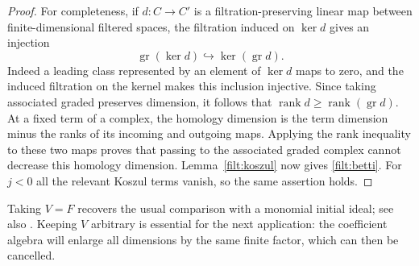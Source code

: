 \begin{proof}
For completeness, if $d:C\to C'$ is a filtration-preserving linear
map between finite-dimensional filtered spaces, the filtration induced
on $\ker d$ gives an injection
\[
          \operatorname{gr}(\ker d)
               \hookrightarrow\ker(\operatorname{gr}d).
\]
Indeed a leading class represented by an element of $\ker d$ maps to
zero, and the induced filtration on the kernel makes this inclusion
injective.  Since taking associated graded preserves dimension, it
follows that
$\operatorname{rank}d\geq\operatorname{rank}(\operatorname{gr}d)$.
At a fixed term of a complex, the homology dimension is the term
dimension minus the ranks of its incoming and outgoing maps.  Applying
the rank inequality to these two maps proves that passing to the
associated graded complex cannot decrease this homology dimension.
Lemma~\ref{filt:koszul} now gives \eqref{filt:betti}.  For $j<0$ all
the relevant Koszul terms vanish, so the same assertion holds.
\end{proof}

Taking $V=F$ recovers the usual comparison with a monomial initial
ideal; see also \cite[Section~2]{MM}. Keeping $V$ arbitrary is essential
for the next application:
the coefficient algebra will enlarge all dimensions by the same
finite factor, which can then be cancelled.
